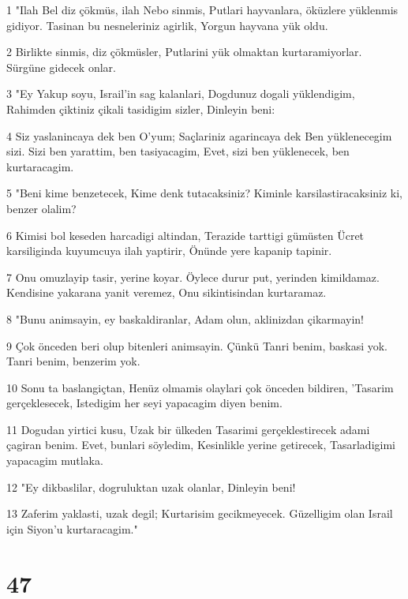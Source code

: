 \par 1 "Ilah Bel diz çökmüs, ilah Nebo sinmis, Putlari hayvanlara, öküzlere yüklenmis gidiyor. Tasinan bu nesneleriniz agirlik, Yorgun hayvana yük oldu.
\par 2 Birlikte sinmis, diz çökmüsler, Putlarini yük olmaktan kurtaramiyorlar. Sürgüne gidecek onlar.
\par 3 "Ey Yakup soyu, Israil'in sag kalanlari, Dogdunuz dogali yüklendigim, Rahimden çiktiniz çikali tasidigim sizler, Dinleyin beni:
\par 4 Siz yaslanincaya dek ben O'yum; Saçlariniz agarincaya dek Ben yüklenecegim sizi. Sizi ben yarattim, ben tasiyacagim, Evet, sizi ben yüklenecek, ben kurtaracagim.
\par 5 "Beni kime benzetecek, Kime denk tutacaksiniz? Kiminle karsilastiracaksiniz ki, benzer olalim?
\par 6 Kimisi bol keseden harcadigi altindan, Terazide tarttigi gümüsten Ücret karsiliginda kuyumcuya ilah yaptirir, Önünde yere kapanip tapinir.
\par 7 Onu omuzlayip tasir, yerine koyar. Öylece durur put, yerinden kimildamaz. Kendisine yakarana yanit veremez, Onu sikintisindan kurtaramaz.
\par 8 "Bunu animsayin, ey baskaldiranlar, Adam olun, aklinizdan çikarmayin!
\par 9 Çok önceden beri olup bitenleri animsayin. Çünkü Tanri benim, baskasi yok. Tanri benim, benzerim yok.
\par 10 Sonu ta baslangiçtan, Henüz olmamis olaylari çok önceden bildiren, 'Tasarim gerçeklesecek, Istedigim her seyi yapacagim diyen benim.
\par 11 Dogudan yirtici kusu, Uzak bir ülkeden Tasarimi gerçeklestirecek adami çagiran benim. Evet, bunlari söyledim, Kesinlikle yerine getirecek, Tasarladigimi yapacagim mutlaka.
\par 12 "Ey dikbaslilar, dogruluktan uzak olanlar, Dinleyin beni!
\par 13 Zaferim yaklasti, uzak degil; Kurtarisim gecikmeyecek. Güzelligim olan Israil için Siyon'u kurtaracagim."

\chapter{47}

